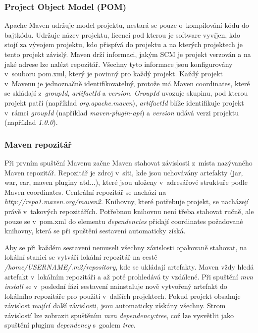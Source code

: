 \documentclass[11pt,twoside,a4paper]{book}
\begin{document}
\subsubsection{Project Object Model (POM)}

Apache Maven udržuje model projektu, nestará se pouze o~kompilování kódu do bajtkódu.
Udržuje název projektu, licenci pod kterou je software vyvíjen, kdo stojí za vývojem projektu,
kdo přispívá do projektu a na kterých projektech je tento projekt závislý. Maven drží
informaci, jakým SCM je projekt verzován a na jaké adrese lze nalézt repozitář. Všechny tyto
informace jsou konfigurovány v~souboru pom.xml, který je povinný pro každý projekt. Každý
projekt v~Mavenu je jednoznačně identifikovatelný, protože má Maven coordinates, které se
skládají z~{\em groupId}, {\em artifactId} a {\em version}. 
{\em GroupId} uvozuje skupinu, pod kterou projekt patří (například
{\em org.apache.maven}), {\em artifactId} blíže identifikuje projekt v~rámci
{\em groupId} (například {\em maven-plugin-api}) a {\em version} udává verzi projektu
(například {\em 1.0.0}).

\subsubsection{Maven repozitář}

Při prvním spuštění Mavenu začne Maven stahovat závislosti z~místa nazývaného Maven
repozitář. Repozitář je zdroj v~síti, kde jsou uchovávány artefakty (jar, war,
ear, maven pluginy atd...), které jsou uloženy v~adresářové struktuře podle Maven coordinates. Centrální
repozitář se nachází na {\em http://repo1.maven.org/maven2}. Knihovny, které
potřebuje projekt, se nacházejí právě v~takových repozitářích. Potřebnou knihovnu není třeba
stahovat ručně, ale pouze se v~pom.xml do elementu {\em dependencies} přidají
coordinates požadované knihovny, která se při spuštění sestavení automaticky získá.

Aby se při každém sestavení nemuseli všechny závislosti opakovaně stahovat, na
lokální stanici se vytváří lokální repozitář na cestě {\em
/home/USERNAME/.m2/repository}, kde se ukládají artefakty. Maven vždy hledá
artefakt v~lokálním repozitáři a až poté prohledává ty vzdálené. Při spuštění
{\em mvn install} se v~poslední fázi sestavení nainstaluje nově vytvořený
artefakt do lokálního repozitáře pro použití v~dalších projektech. Pokud projekt obsahuje
závislost mající další závislosti, jsou automaticky získány všechny. Strom
závislostí lze zobrazit spuštěním {\em mvn dependency:tree}, což lze
vysvětlit jako spuštění pluginu {\em dependency} s~goalem {\em tree}.
\end{document}
